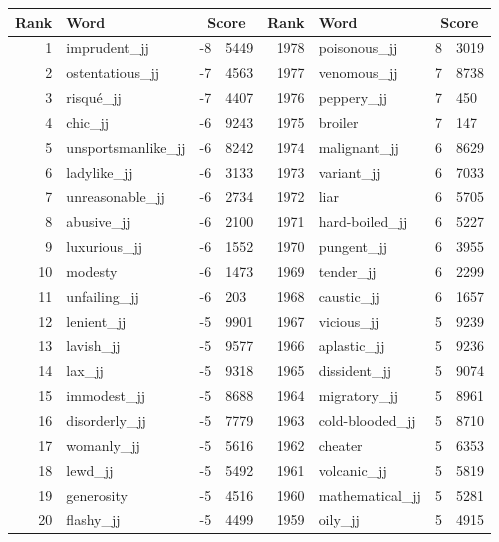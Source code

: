 \begin{table}[tbp]
    \begin{tabular}{| rlr@{.}l | rlr@{.}l |}
    \hline
    \textbf{Rank} & \textbf{Word} & \multicolumn{2}{c|}{\textbf{Score}} & \textbf{Rank} & \textbf{Word} & \multicolumn{2}{c|}{\textbf{Score}} \\
    \hline
    1 & imprudent\_jj & -8 & 5449    &    1978 & poisonous\_jj & 8 & 3019 \\
    2 & ostentatious\_jj & -7 & 4563    &    1977 & venomous\_jj & 7 & 8738 \\
    3 & risqué\_jj & -7 & 4407    &    1976 & peppery\_jj & 7 & 450 \\
    4 & chic\_jj & -6 & 9243    &    1975 & broiler & 7 & 147 \\
    5 & unsportsmanlike\_jj & -6 & 8242    &    1974 & malignant\_jj & 6 & 8629 \\
    6 & ladylike\_jj & -6 & 3133    &    1973 & variant\_jj & 6 & 7033 \\
    7 & unreasonable\_jj & -6 & 2734    &    1972 & liar & 6 & 5705 \\
    8 & abusive\_jj & -6 & 2100    &    1971 & hard-boiled\_jj & 6 & 5227 \\
    9 & luxurious\_jj & -6 & 1552    &    1970 & pungent\_jj & 6 & 3955 \\
    10 & modesty & -6 & 1473    &    1969 & tender\_jj & 6 & 2299 \\
    11 & unfailing\_jj & -6 & 203    &    1968 & caustic\_jj & 6 & 1657 \\
    12 & lenient\_jj & -5 & 9901    &    1967 & vicious\_jj & 5 & 9239 \\
    13 & lavish\_jj & -5 & 9577    &    1966 & aplastic\_jj & 5 & 9236 \\
    14 & lax\_jj & -5 & 9318    &    1965 & dissident\_jj & 5 & 9074 \\
    15 & immodest\_jj & -5 & 8688    &    1964 & migratory\_jj & 5 & 8961 \\
    16 & disorderly\_jj & -5 & 7779    &    1963 & cold-blooded\_jj & 5 & 8710 \\
    17 & womanly\_jj & -5 & 5616    &    1962 & cheater & 5 & 6353 \\
    18 & lewd\_jj & -5 & 5492    &    1961 & volcanic\_jj & 5 & 5819 \\
    19 & generosity & -5 & 4516    &    1960 & mathematical\_jj & 5 & 5281 \\
    20 & flashy\_jj & -5 & 4499    &    1959 & oily\_jj & 5 & 4915 \\

\end{tabular}
\end{table}
